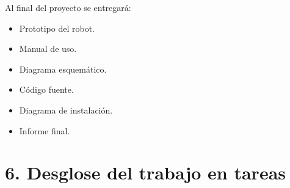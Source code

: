 \documentclass[11pt]{charter}
\begin{document}
Al final del proyecto se entregará: 
\begin{itemize}
\item Prototipo del robot.
\item Manual de uso.
\item Diagrama esquemático.
\item Código fuente.
\item Diagrama de instalación.
\item Informe final.

\end{itemize}


\section{6. Desglose del trabajo en tareas}
\label{sec:wbs}
\end{document}
